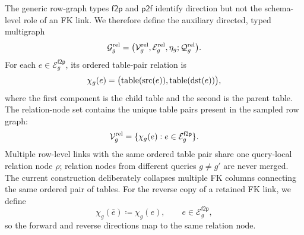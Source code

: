 The generic row-graph types \(\mathsf{f2p}\) and \(\mathsf{p2f}\) identify
direction but not the schema-level role of an FK link. We therefore define
the auxiliary directed, typed multigraph
\begin{equation}
  \mathcal G_g^{\mathrm{rel}}
  =
  \bigl(
    \mathcal V_g^{\mathrm{rel}},
    \mathcal E_g^{\mathrm{rel}},
    \eta_g;
    \mathcal Q_g^{\mathrm{rel}}
  \bigr).
\label{eq:method:relation-graph}
\end{equation}
For each \(e\in\mathcal E_g^{\mathsf{f2p}}\), its ordered table-pair
relation is
\begin{equation}
  \chi_g(e)
  =
  \bigl(
    \operatorname{table}(\operatorname{src}(e)),
    \operatorname{table}(\operatorname{dst}(e))
  \bigr),
\label{eq:method:fk-to-relation}
\end{equation}
where the first component is the child table and the second is the parent
table. The relation-node set contains the unique table pairs present in the
sampled row graph:
\begin{equation}
  \mathcal V_g^{\mathrm{rel}}
  =
  \{\chi_g(e):e\in\mathcal E_g^{\mathsf{f2p}}\}.
\label{eq:method:relation-node-set}
\end{equation}
Multiple row-level links with the same ordered table pair share one
query-local relation node \(\rho\); relation nodes from different queries
\(g\ne g'\) are never merged. The current construction deliberately
collapses multiple FK columns connecting the same ordered pair of tables.
For the reverse copy of a retained FK link, we define
\begin{equation}
  \chi_g(\bar e)\coloneqq\chi_g(e),
  \qquad e\in\mathcal E_g^{\mathsf{f2p}},
\label{eq:method:reverse-fk-relation}
\end{equation}
so the forward and reverse directions map to the same relation node.

